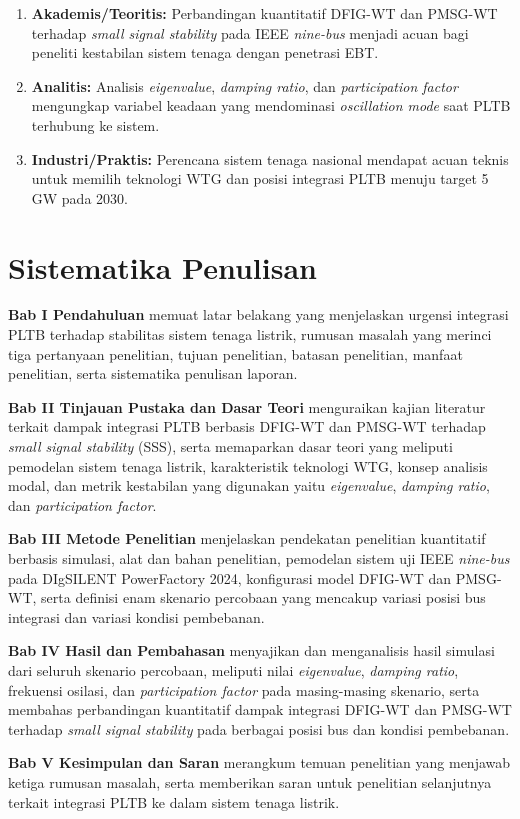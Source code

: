 \begin{enumerate}
	\item \textbf{Akademis/Teoritis:} Perbandingan kuantitatif DFIG-WT dan
	PMSG-WT terhadap \textit{small signal stability} pada IEEE \textit{nine-bus}
	menjadi acuan bagi peneliti kestabilan sistem tenaga dengan penetrasi EBT.
	\item \textbf{Analitis:} Analisis \textit{eigenvalue}, \textit{damping
	ratio}, dan \textit{participation factor} mengungkap variabel keadaan yang
	mendominasi \textit{oscillation mode} saat PLTB terhubung ke sistem.
	\item \textbf{Industri/Praktis:} Perencana sistem tenaga nasional mendapat
	acuan teknis untuk memilih teknologi WTG dan posisi integrasi PLTB menuju
	target 5 GW pada 2030.
\end{enumerate}



\section{Sistematika Penulisan}

\noindent \textbf{Bab I Pendahuluan} memuat latar belakang yang menjelaskan
urgensi integrasi PLTB terhadap stabilitas sistem tenaga listrik, rumusan masalah
yang merinci tiga pertanyaan penelitian, tujuan penelitian, batasan penelitian,
manfaat penelitian, serta sistematika penulisan laporan.

\noindent \textbf{Bab II Tinjauan Pustaka dan Dasar Teori} menguraikan kajian
literatur terkait dampak integrasi PLTB berbasis DFIG-WT dan PMSG-WT terhadap
\textit{small signal stability} (SSS), serta memaparkan dasar teori yang meliputi
pemodelan sistem tenaga listrik, karakteristik teknologi WTG, konsep analisis
modal, dan metrik kestabilan yang digunakan yaitu \textit{eigenvalue},
\textit{damping ratio}, dan \textit{participation factor}.

\noindent \textbf{Bab III Metode Penelitian} menjelaskan pendekatan penelitian
kuantitatif berbasis simulasi, alat dan bahan penelitian, pemodelan sistem uji
IEEE \textit{nine-bus} pada DIgSILENT PowerFactory 2024, konfigurasi model
DFIG-WT dan PMSG-WT, serta definisi enam skenario percobaan yang mencakup
variasi posisi bus integrasi dan variasi kondisi pembebanan.

\noindent \textbf{Bab IV Hasil dan Pembahasan} menyajikan dan menganalisis hasil
simulasi dari seluruh skenario percobaan, meliputi nilai \textit{eigenvalue},
\textit{damping ratio}, frekuensi osilasi, dan \textit{participation factor} pada
masing-masing skenario, serta membahas perbandingan kuantitatif dampak integrasi
DFIG-WT dan PMSG-WT terhadap \textit{small signal stability} pada berbagai posisi
bus dan kondisi pembebanan.

\noindent \textbf{Bab V Kesimpulan dan Saran} merangkum temuan penelitian yang
menjawab ketiga rumusan masalah, serta memberikan saran untuk penelitian
selanjutnya terkait integrasi PLTB ke dalam sistem tenaga listrik.

